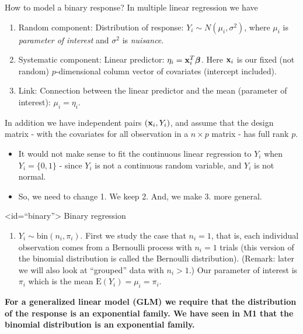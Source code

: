 \documentclass[
  ignorenonframetext,
]{beamer}
\providecommand{\tightlist}{%
  \setlength{\itemsep}{0pt}\setlength{\parskip}{0pt}}
\begin{document}
\begin{frame}{How to model a binary response?}
\protect\hypertarget{how-to-model-a-binary-response}{}
In multiple linear regression we have

\begin{enumerate}
\item
  Random component: Distribution of response:
  \(Y_i\sim N(\mu_i,\sigma^2)\), where \(\mu_i\) is \emph{parameter of
  interest} and \(\sigma^2\) is \emph{nuisance}.
\item
  Systematic component: Linear predictor:
  \(\eta_i={\bf x}_i^T \boldsymbol{\beta}\). Here \({\bf x}_i\) is our
  fixed (not random) \(p\)-dimensional column vector of covariates
  (intercept included).
\item
  Link: Connection between the linear predictor and the mean (parameter
  of interest): \(\mu_i=\eta_i\).
\end{enumerate}

In addition we have independent pairs \(({\bf x}_i,Y_i)\), and assume
that the design matrix - with the covariates for all observation in a
\(n \times p\) matrix - has full rank \(p\).

\begin{itemize}
\tightlist
\item
  It would not make sense to fit the continuous linear regression to
  \(Y_i\) when \(Y_i=\{0,1\}\) - since \(Y_i\) is not a continuous
  random variable, and \(Y_i\) is not normal.
\item
  So, we need to change 1. We keep 2. And, we make 3. more general.
\end{itemize}
\end{frame}

\begin{frame}
\begin{block}{\textless id=``binary''\textgreater{} Binary regression}
\protect\hypertarget{idbinary-binary-regression}{}
\begin{enumerate}
\tightlist
\item
  \(Y_i \sim \text{bin}(n_i,\pi_i)\). First we study the case that
  \(n_i=1\), that is, each individual observation comes from a Bernoulli
  process with \(n_i=1\) trials (this version of the binomial
  distribution is called the Bernoulli distribution). (Remark: later we
  will also look at ``grouped'' data with \(n_i>1\).) Our parameter of
  interest is \(\pi_i\) which is the mean \(\text{E}(Y_i)=\mu_i=\pi_i\).
\end{enumerate}

\textbf{For a generalized linear model (GLM) we require that the
distribution of the response is an exponential family. We have seen in
M1 that the binomial distribution is an exponential family.}
\end{block}
\end{frame}
\end{document}
